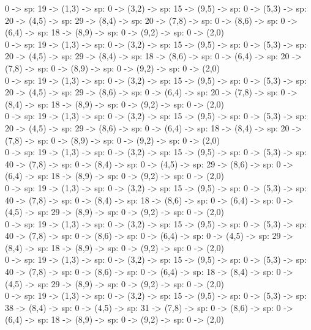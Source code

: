 \documentclass[10pt,a4paper]{article}
\begin{document}
0 -> sp: 19 -> (1,3) -> sp: 0 -> (3,2) -> sp: 15 -> (9,5) -> sp: 0 -> (5,3) -> sp: 20 -> (4,5) -> sp: 29 -> (8,4) -> sp: 20 -> (7,8) -> sp: 0 -> (8,6) -> sp: 0 -> (6,4) -> sp: 18 -> (8,9) -> sp: 0 -> (9,2) -> sp: 0 -> (2,0)\\

0 -> sp: 19 -> (1,3) -> sp: 0 -> (3,2) -> sp: 15 -> (9,5) -> sp: 0 -> (5,3) -> sp: 20 -> (4,5) -> sp: 29 -> (8,4) -> sp: 18 -> (8,6) -> sp: 0 -> (6,4) -> sp: 20 -> (7,8) -> sp: 0 -> (8,9) -> sp: 0 -> (9,2) -> sp: 0 -> (2,0)\\

0 -> sp: 19 -> (1,3) -> sp: 0 -> (3,2) -> sp: 15 -> (9,5) -> sp: 0 -> (5,3) -> sp: 20 -> (4,5) -> sp: 29 -> (8,6) -> sp: 0 -> (6,4) -> sp: 20 -> (7,8) -> sp: 0 -> (8,4) -> sp: 18 -> (8,9) -> sp: 0 -> (9,2) -> sp: 0 -> (2,0)\\

0 -> sp: 19 -> (1,3) -> sp: 0 -> (3,2) -> sp: 15 -> (9,5) -> sp: 0 -> (5,3) -> sp: 20 -> (4,5) -> sp: 29 -> (8,6) -> sp: 0 -> (6,4) -> sp: 18 -> (8,4) -> sp: 20 -> (7,8) -> sp: 0 -> (8,9) -> sp: 0 -> (9,2) -> sp: 0 -> (2,0)\\

0 -> sp: 19 -> (1,3) -> sp: 0 -> (3,2) -> sp: 15 -> (9,5) -> sp: 0 -> (5,3) -> sp: 40 -> (7,8) -> sp: 0 -> (8,4) -> sp: 0 -> (4,5) -> sp: 29 -> (8,6) -> sp: 0 -> (6,4) -> sp: 18 -> (8,9) -> sp: 0 -> (9,2) -> sp: 0 -> (2,0)\\

0 -> sp: 19 -> (1,3) -> sp: 0 -> (3,2) -> sp: 15 -> (9,5) -> sp: 0 -> (5,3) -> sp: 40 -> (7,8) -> sp: 0 -> (8,4) -> sp: 18 -> (8,6) -> sp: 0 -> (6,4) -> sp: 0 -> (4,5) -> sp: 29 -> (8,9) -> sp: 0 -> (9,2) -> sp: 0 -> (2,0)\\

0 -> sp: 19 -> (1,3) -> sp: 0 -> (3,2) -> sp: 15 -> (9,5) -> sp: 0 -> (5,3) -> sp: 40 -> (7,8) -> sp: 0 -> (8,6) -> sp: 0 -> (6,4) -> sp: 0 -> (4,5) -> sp: 29 -> (8,4) -> sp: 18 -> (8,9) -> sp: 0 -> (9,2) -> sp: 0 -> (2,0)\\

0 -> sp: 19 -> (1,3) -> sp: 0 -> (3,2) -> sp: 15 -> (9,5) -> sp: 0 -> (5,3) -> sp: 40 -> (7,8) -> sp: 0 -> (8,6) -> sp: 0 -> (6,4) -> sp: 18 -> (8,4) -> sp: 0 -> (4,5) -> sp: 29 -> (8,9) -> sp: 0 -> (9,2) -> sp: 0 -> (2,0)\\

0 -> sp: 19 -> (1,3) -> sp: 0 -> (3,2) -> sp: 15 -> (9,5) -> sp: 0 -> (5,3) -> sp: 38 -> (8,4) -> sp: 0 -> (4,5) -> sp: 31 -> (7,8) -> sp: 0 -> (8,6) -> sp: 0 -> (6,4) -> sp: 18 -> (8,9) -> sp: 0 -> (9,2) -> sp: 0 -> (2,0)\\
\end{document}
